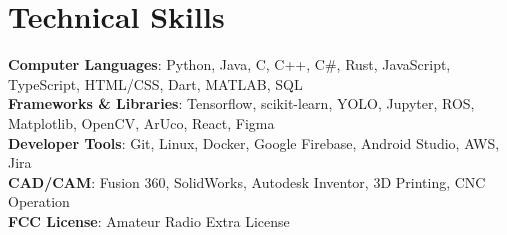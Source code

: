 \documentclass[letterpaper,11pt]{article}
\begin{document}
%
\section{Technical Skills}
 \begin{itemize}[leftmargin=0.15in, label={}]
    \small{\item{
     \textbf{Computer Languages}{: Python, Java, C, C++, C\#, Rust, JavaScript, TypeScript, HTML/CSS, Dart, MATLAB, SQL} \\
     \textbf{Frameworks \& Libraries}{: Tensorflow, scikit-learn, YOLO, Jupyter, ROS, Matplotlib, OpenCV, ArUco, React, Figma} \\
     \textbf{Developer Tools}{: Git, Linux, Docker, Google Firebase, Android Studio, AWS, Jira} \\
     \textbf{CAD/CAM}{: Fusion 360, SolidWorks, Autodesk Inventor, 3D Printing, CNC Operation} \\
     \textbf{FCC License}{: Amateur Radio Extra License} \\
    }}
 \end{itemize}


\end{document}
